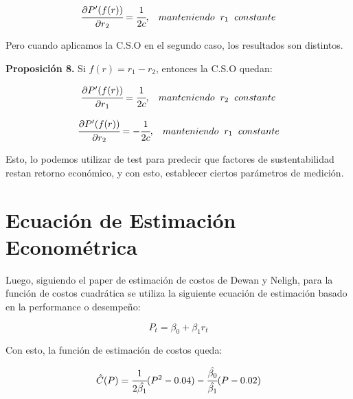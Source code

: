 \documentclass[11pt,letterpaper]{article}
\begin{document}
\begin{equation} 
    \cfrac{\partial P'(f(r))}{\partial r_2} = \cfrac{1}{2c}, \hspace{0,3 cm} manteniendo \hspace{0,2 cm} r_1 \hspace{0,2 cm}constante
\end{equation}

\vspace{0,5cm}

Pero cuando aplicamos la C.S.O en el segundo caso, los resultados son distintos.

\vspace{0,5 cm}
\textbf{Proposición 8.} Si $f(r) = r_1 - r_2$, entonces la  C.S.O quedan:

\begin{equation} 
    \cfrac{\partial P'(f(r))}{\partial r_1} = \cfrac{1}{2c}, \hspace{0,3 cm} manteniendo \hspace{0,2 cm} r_2 \hspace{0,2 cm}constante
\end{equation}

\begin{equation} 
    \cfrac{\partial P'(f(r))}{\partial r_2} = -\cfrac{1}{2c}, \hspace{0,3 cm} manteniendo \hspace{0,2 cm} r_1 \hspace{0,2 cm}constante
\end{equation}

Esto, lo podemos utilizar de test para predecir que factores de sustentabilidad restan retorno económico, y con esto, establecer ciertos parámetros de medición.

\section{Ecuación de Estimación Econométrica}

Luego, siguiendo el paper de estimación de costos de Dewan y Neligh, para la función de costos cuadrática se utiliza la siguiente ecuación de estimación basado en la performance o desempeño:

\begin{equation}
    P_t = \beta_0 + \beta_1 r_t
\end{equation}

Con esto, la función de estimación de costos queda:

\begin{equation}
    \Hat{C}(P) = \cfrac{1}{2\Hat{\beta_1}}(P^2 - 0.04) - \cfrac{\Hat{\beta_0}}{\Hat{\beta_1}}(P-0.02)
\end{equation}
\end{document}
